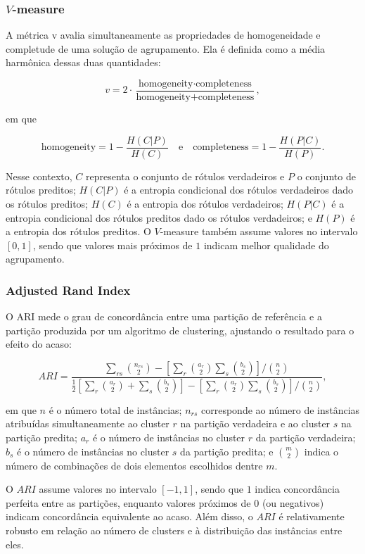 \subsubsection{$V$-measure}

A métrica  \gls{v} \cite{rosenberg2007vmeasure} avalia simultaneamente as propriedades de homogeneidade e completude de uma solução de agrupamento. Ela é definida como a média harmônica dessas duas quantidades:

\[
v = 2 \cdot \frac{\text{homogeneity} \cdot \text{completeness}}{\text{homogeneity} + \text{completeness}},
\]

em que

\[
\text{homogeneity} = 1 - \frac{H(C|P)}{H(C)}
\quad \text{e} \quad
\text{completeness} = 1 - \frac{H(P|C)}{H(P)}.
\]

Nesse contexto, $C$ representa o conjunto de rótulos verdadeiros e $P$ o conjunto de rótulos preditos; $H(C|P)$ é a entropia condicional dos rótulos verdadeiros dado os rótulos preditos; $H(C)$ é a entropia dos rótulos verdadeiros; $H(P|C)$ é a entropia condicional dos rótulos preditos dado os rótulos verdadeiros; e $H(P)$ é a entropia dos rótulos preditos. O $V$-measure também assume valores no intervalo $[0,1]$, sendo que valores mais próximos de $1$ indicam melhor qualidade do agrupamento.

\subsubsection{Adjusted Rand Index}

O \gls{ARI} \cite{hubert1985comparing} mede o grau de concordância entre uma partição de referência e a partição produzida por um algoritmo de clustering, ajustando o resultado para o efeito do acaso:

\[
ARI = \frac{\sum_{rs} \binom{n_{rs}}{2} - \left[\sum_r \binom{a_r}{2} \sum_s \binom{b_s}{2}\right] / \binom{n}{2}}
{\frac{1}{2}\left[\sum_r \binom{a_r}{2} + \sum_s \binom{b_s}{2}\right] - \left[\sum_r \binom{a_r}{2} \sum_s \binom{b_s}{2}\right] / \binom{n}{2}},
\]

em que $n$ é o número total de instâncias; $n_{rs}$ corresponde ao número de instâncias atribuídas simultaneamente ao cluster $r$ na partição verdadeira e ao cluster $s$ na partição predita; $a_r$ é o número de instâncias no cluster $r$ da partição verdadeira; $b_s$ é o número de instâncias no cluster $s$ da partição predita; e $\binom{m}{2}$ indica o número de combinações de dois elementos escolhidos dentre $m$.

O $ARI$ assume valores no intervalo $[-1,1]$, sendo que $1$ indica concordância perfeita entre as partições, enquanto valores próximos de $0$ (ou negativos) indicam concordância equivalente ao acaso. Além disso, o $ARI$ é relativamente robusto em relação ao número de clusters e à distribuição das instâncias entre eles.